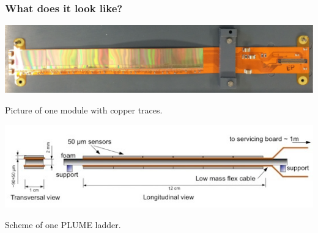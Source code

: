 \documentclass{beamer}
\begin{document}
\begin{frame}
  \frametitle{What does it look like?}

  \begin{center}
    \includegraphics[width = 10 cm]{Pictures/PLUME_copper_module.png}

    Picture of one module with copper traces.
  \end{center}

  \vspace{-0.2cm}
  \begin{center}
    \includegraphics[width = 10 cm]{Pictures/scheme_plume.png}

    Scheme of one PLUME ladder.
  \end{center}
\end{frame}

\end{document}
